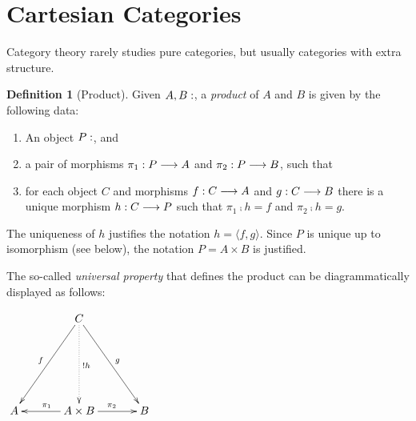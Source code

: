 \documentclass[a4paper,fleqn]{scrartcl}
\theoremstyle{definition}
\newtheorem{definition}{Definition}
\let\C\relax %
\newcommand{\C}{\mathcal{C}}
\begin{document}
\section{Cartesian Categories}

Category theory rarely studies pure categories, but usually categories with
extra structure.

\begin{definition}[Product]
  Given $A,B : \C$, a \emph{product} of $A$ and $B$ is given by the
  following data:
  \begin{enumerate}
  \item An object $P : \C$, and
  \item a pair of morphisms $\pi_1 : P \longrightarrow A$ and $\pi_2 : P \longrightarrow B$,
    such that
  \item for each object $C$ and morphisms $f : C \longrightarrow A$ and $g : C
    \longrightarrow B$ there is a unique morphism $h : C \longrightarrow P$ such that $\pi_1
    \comp h = f$ and $\pi_2 \comp h = g$.
  \end{enumerate}
  The uniqueness of $h$ justifies the notation $h = \langle f,g \rangle$.
  Since $P$ is unique up to isomorphism (see below),
  the notation $P = A \times B$
  is justified.
\end{definition}
The so-called \emph{universal property} that defines the product can
be diagrammatically displayed as follows:
\begin{center}
\(
\xymatrix@C=8ex@R=16ex{
& \ar[dl]_f C \ar@{.>}[d]^{!h} \ar[dr]^g& \\
A & \ar[l]_{\pi_1} A \times B  \ar[r]^{\pi_2} & B \\
}
\)
\end{center}
\end{document}
